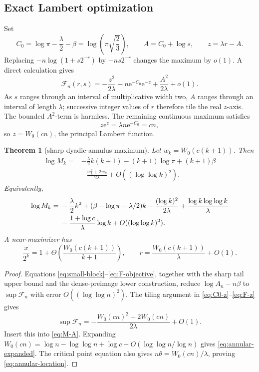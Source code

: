 \documentclass[11pt,oneside]{article}
\newtheorem{theorem}{Theorem}[section]
\theoremstyle{definition}
\theoremstyle{remark}
\newcommand{\e}{\mathrm e}
\newcommand{\Wlam}{W_0}
\begin{document}
\subsection{Exact Lambert optimization}

Set
\begin{equation}
 C_0=\log\pi-\frac\lambda2-\beta
 =\log\!\left(\pi\sqrt{\frac23}\right),
 \qquad A=C_0+\log s,
 \qquad z=\lambda r-A.
 \label{eq:C0-z}
\end{equation}
Replacing \(-n\log(1+s2^{-r})\) by \(-ns2^{-r}\) changes the maximum by
\(o(1)\).  A direct calculation gives
\begin{equation}
 \mathcal F_n(r,s)
 =-\frac{z^2}{2\lambda}-n\e^{-C_0}\e^{-z}
 +\frac{A^2}{2\lambda}+o(1).
 \label{eq:F-z}
\end{equation}
As \(s\) ranges through an interval of multiplicative width two, \(A\) ranges
through an interval of length \(\lambda\); successive integer values of \(r\)
therefore tile the real \(z\)-axis.  The bounded \(A^2\)-term is harmless.
The remaining continuous maximum satisfies
\[
 z\e^z=\lambda n\e^{-C_0}=cn,
\]
so \(z=\Wlam(cn)\), the principal Lambert function.

\begin{theorem}[sharp dyadic-annulus maximum]
\label{thm:annular-max}
Let \(w_k=\Wlam(c(k+1))\).  Then
\begin{equation}
 \boxed{
 \begin{aligned}
 \log M_k={}&-\frac\lambda2k(k+1)-(k+1)\log\pi+(k+1)\beta\\
 &-\frac{w_k^2+2w_k}{2\lambda}
 +O((\log\log k)^2).
 \end{aligned}}
 \label{eq:annular-main}
\end{equation}
Equivalently,
\begin{align}
 \log M_k={}&-\frac\lambda2k^2
 +(\beta-\log\pi-\lambda/2)k
 -\frac{(\log k)^2}{2\lambda}
 +\frac{\log k\log\log k}{\lambda}
 \notag\\
 &-\frac{1+\log c}{\lambda}\log k
 +O((\log\log k)^2).
 \label{eq:annular-expanded}
\end{align}
A near-maximizer has
\begin{equation}
 \frac{x}{2^k}=1+\Theta\!\left(\frac{\Wlam(c(k+1))}{k+1}\right),
 \qquad
 r=\frac{\Wlam(c(k+1))}{\lambda}+O(1).
 \label{eq:annular-location}
\end{equation}
\end{theorem}

\begin{proof}
Equations \eqref{eq:small-block}--\eqref{eq:F-objective}, together with the
sharp tail upper bound and the dense-preimage lower construction, reduce
\(\log A_n-n\beta\) to \(\sup\mathcal F_n\) with error
\(O((\log\log n)^2)\).  The tiling argument in
\eqref{eq:C0-z}--\eqref{eq:F-z} gives
\[
 \sup\mathcal F_n
 =-\frac{\Wlam(cn)^2+2\Wlam(cn)}{2\lambda}+O(1).
\]
Insert this into \eqref{eq:M-A}.  Expanding
\(\Wlam(cn)=\log n-\log\log n+\log c+
O(\log\log n/\log n)\) gives \eqref{eq:annular-expanded}.  The critical
point equation also gives
\(n\theta=\Wlam(cn)/\lambda\), proving
\eqref{eq:annular-location}.
\end{proof}
\end{document}
